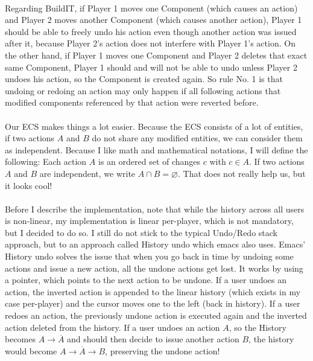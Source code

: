 \documentclass[11pt]{article}
\begin{document}
    \paragraph{}
    Regarding BuildIT, if Player 1 moves one Component (which causes an action) and
    Player 2 moves another Component (which causes another action), Player 1 should
    be able to freely undo his action even though another action was issued after it, because
    Player 2's action does not interfere with Player 1's action.
    On the other hand, if Player 1 moves one Component and Player 2 deletes that exact same Component,
    Player 1 should and will not be able to undo unless Player 2 undoes his action,
    so the Component is created again.
    So rule No. 1 is that undoing or redoing an action may only happen if all following actions that modified
    components referenced by that action were reverted before.

    \paragraph{}
    Our ECS makes things a lot easier.
    Because the ECS consists of a lot of entities, if two actions $A$ and $B$ do not share any modified entities,
    we can consider them as independent.
    Because I like math and mathematical notations, I will define the following:
    Each action $A$ is an ordered set of changes $c$ with $c \in A$.
    If two actions $A$ and $B$ are independent, we write $A \cap B = \varnothing $.
    That does not really help us, but it looks cool!

    \paragraph{}
    Before I describe the implementation, note that while the history across all users is non-linear,
    my implementation is linear per-player, which is not mandatory, but I decided to do so.
    I still do not stick to the typical Undo/Redo stack approach, but to an approach called History undo
    which emacs also uses.
    Emacs' History undo solves the issue that when you go back in time by undoing some actions and issue
    a new action, all the undone actions get lost.
    It works by using a pointer, which points to the next action to be undone.
    If a user undoes an action, the inverted action is appended to the linear history (which exists in my case per-player)
    and the cursor moves one to the left (back in history).
    If a user redoes an action, the previously undone action is executed again and the inverted action deleted from the history.
    If a user undoes an action $A$, so the History becomes $A \rightarrow \overline{A}$ and
    should then decide to issue another action $B$, the history would become $A \rightarrow \overline{A} \rightarrow B$, preserving
    the undone action!
\end{document}
